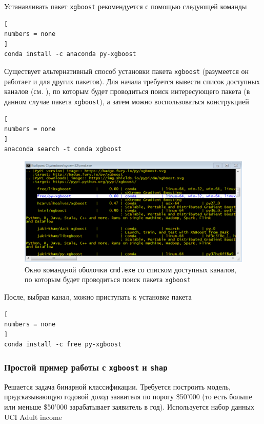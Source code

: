 \documentclass[%
	11pt,
	a4paper,
	utf8,
		]{article}
\begin{document}
Устанавливать пакет \texttt{xgboost} рекомендуется с помощью следующей команды

\begin{lstlisting}[
numbers = none
]
conda install -c anaconda py-xgboost 
\end{lstlisting}

Существует альтернативный способ установки пакета \texttt{xgboost} (разумеется он работает и для других пакетов). Для начала требуется вывести список доступных каналов (см. ), по которым будет проводиться поиск интересующего пакета (в данном случае пакета \texttt{xgboost}), а затем можно воспользоваться конструкцией

\begin{lstlisting}[
numbers = none
]
anaconda search -t conda xgboost
\end{lstlisting}

\begin{figure}[h]
	\centering
	\includegraphics[scale=0.85]{figures/xgboost_conda_search.png}
	\caption{Окно командной оболочки \texttt{cmd.exe} со списком доступных каналов, по которым будет проводиться поиск пакета \texttt{xgboost} }\label{fig:xgboost_conda_search}
\end{figure}


После, выбрав канал, можно приступать к установке пакета

\begin{lstlisting}[
numbers = none
]
conda install -c free py-xgboost
\end{lstlisting}

\subsubsection{Простой пример работы с \texttt{xgboost} и \texttt{shap}}

Решается задача бинарной классификации. Требуется построить модель, предсказывающую годовой доход заявителя по порогу \$50'000 (то есть больше или меньше \$50'000 зарабатывает заявитель в год). Используется набор данных  UCI Adult income
\end{document}
